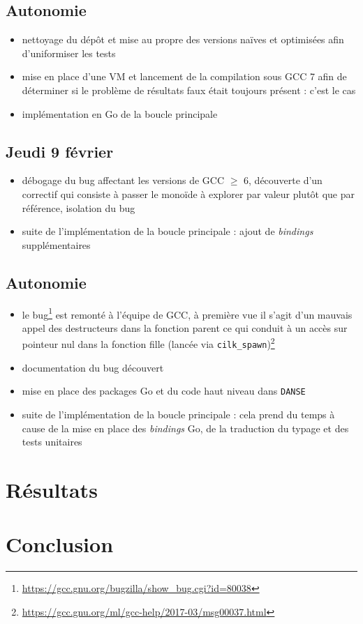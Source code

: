 \documentclass[12pt,a4paper]{article}
\let\geq\geqslant
\begin{document}
\subsection*{Autonomie}
\begin{itemize}
	\item	nettoyage du dépôt et mise au propre des versions naïves et optimisées afin d'uniformiser les tests
	\item	mise en place d'une VM et lancement de la compilation sous GCC 7 afin de déterminer si le problème de résultats faux était toujours présent : c'est le cas
	\item	implémentation en Go de la boucle principale
\end{itemize}

\subsection*{Jeudi 9 février}
\begin{itemize}
	\item	débogage du bug affectant les versions de GCC $\geq$ 6, découverte d'un correctif qui consiste à passer le monoïde à explorer par valeur plutôt que par référence, isolation du bug
	\item	suite de l'implémentation de la boucle principale : ajout de \emph{bindings} supplémentaires
\end{itemize}

\subsection*{Autonomie}
\begin{itemize}
	\item	le bug\footnote{\url{https://gcc.gnu.org/bugzilla/show_bug.cgi?id=80038}} est remonté à l'équipe de GCC, à première vue il s'agit d'un mauvais appel des destructeurs dans la fonction parent ce qui conduit à un accès sur pointeur nul dans la fonction fille (lancée via \texttt{cilk\_spawn})\footnote{\url{https://gcc.gnu.org/ml/gcc-help/2017-03/msg00037.html}}
	\item	documentation du bug découvert
	\item	mise en place des packages Go et du code haut niveau dans \texttt{DANSE}
	\item	suite de l'implémentation de la boucle principale : cela prend du temps à cause de la mise en place des \emph{bindings} Go, de la traduction du typage et des tests unitaires
\end{itemize}

\section*{Résultats}

\section*{Conclusion}
\end{document}
